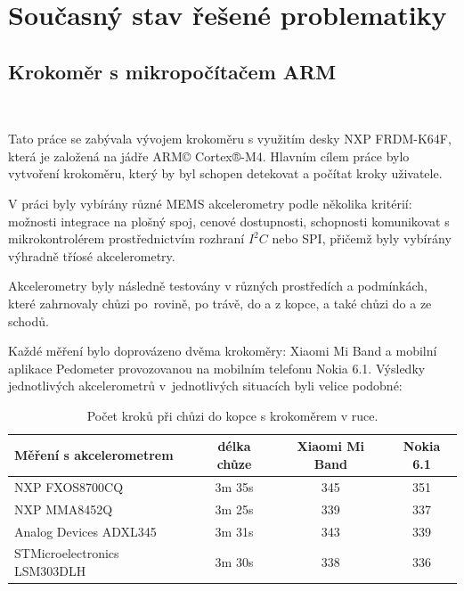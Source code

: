 \chapter{Současný stav řešené problematiky}
\label{sec:Theory}
\vspace{-20pt}

\section{Krokoměr s mikropočítačem ARM}\

Tato práce se zabývala vývojem krokoměru s využitím desky NXP FRDM-K64F, která je založená na jádře ARM© Cortex®-M4. Hlavním cílem práce bylo vytvoření krokoměru, který by byl schopen detekovat a počítat kroky uživatele.

V práci byly vybírány různé MEMS akcelerometry podle několika kritérií: možnosti integrace na plošný spoj, cenové dostupnosti, schopnosti komunikovat s mikrokontrolérem prostřednictvím rozhraní $I^2C$ nebo SPI, přičemž byly vybírány výhradně tříosé akcelerometry.

Akcelerometry byly následně testovány v různých prostředích a podmínkách, které zahrnovaly chůzi po~rovině, po trávě, do a z kopce, a také chůzi do a ze schodů.

Každé měření bylo doprovázeno dvěma krokoměry:  Xiaomi Mi Band a mobilní aplikace Pedometer provozovanou na mobilním telefonu Nokia 6.1. Výsledky jednotlivých akcelerometrů v~jednotlivých situacích byli velice podobné:

\begin{table}[!htbp]
	\centering
	\begin{tabular}{lccc}
		\toprule
		Měření s akcelerometrem      & délka chůze & Xiaomi Mi Band & Nokia 6.1 \\
		\midrule
		NXP FXOS8700CQ               & 3m 35s      & 345            & 351       \\
		NXP MMA8452Q                 & 3m 25s      & 339            & 337       \\
		Analog Devices ADXL345       & 3m 31s      & 343            & 339       \\
		STMicroelectronics LSM303DLH & 3m 30s      & 338            & 336       \\
		\bottomrule
	\end{tabular}
	\caption{Počet kroků při chůzi do kopce s krokoměrem v ruce.}
	\label{tab:1}
	\vspace{-15pt}
\end{table}

